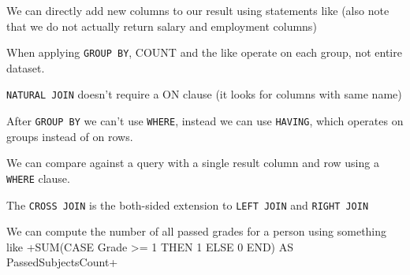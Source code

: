 We can directly add new columns to our result using statements like (also note that we do not actually return salary and employment columns)

When applying \texttt{GROUP BY}, COUNT and the like operate on each group, not entire dataset.

\texttt{NATURAL JOIN} doesn't require a ON clause (it looks for columns with same name)

After \texttt{GROUP BY} we can't use \texttt{WHERE}, instead we can use \texttt{HAVING}, which operates on groups instead of on rows.

We can compare against a query with a single result column and row using a \texttt{WHERE} clause.

The \texttt{CROSS JOIN} is the both-sided extension to \texttt{LEFT JOIN} and \texttt{RIGHT JOIN}

We can compute the number of all passed grades for a person using something like
+SUM(CASE Grade >= 1 THEN 1 ELSE 0 END) AS PassedSubjectsCount+
